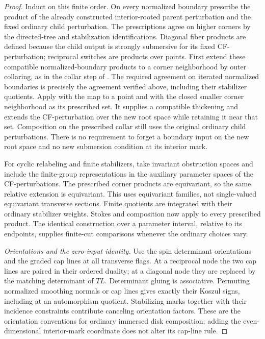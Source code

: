 \documentclass[11pt]{article}
\numberwithin{equation}{section}
\theoremstyle{definition}
\theoremstyle{remark}
\begin{document}
\begin{proof}
Induct on this finite order.  On every normalized boundary prescribe
the product of the already constructed interior-rooted parent
perturbation and the fixed ordinary child perturbation.  The
prescriptions agree on higher corners by the directed-tree and
stabilization identifications.  Diagonal fiber products are defined
because the child output is strongly submersive for its fixed
CF-perturbation; reciprocal switches are products over points.
First extend these compatible normalized-boundary products to a
corner neighborhood by outer collaring, as in the collar step of
\cite[Proposition~14.8 and Remark~14.7]{AFOOO2026}.  The required
agreement on iterated normalized boundaries is precisely the
agreement verified above, including their stabilizer quotients.
Apply \cite[Proposition~14.5]{AFOOO2026} with the map to a point
and with the closed smaller corner neighborhood as its prescribed
set.  It supplies a compatible thickening and extends the
CF-perturbation over the new root space while retaining it near
that set.  Composition on the prescribed collar still uses the
original ordinary child perturbations.  There is no requirement
to forget a boundary input on the new root space and no new
submersion condition at its interior mark.

For cyclic relabeling and finite stabilizers, take invariant
obstruction spaces and include the finite-group representations in
the auxiliary parameter spaces of the CF-perturbations.  The
prescribed corner products are equivariant, so the same relative
extension is equivariant.  This uses equivariant families, not
single-valued equivariant transverse sections.  Finite quotients
are integrated with their ordinary stabilizer weights.  Stokes and
composition now apply to every prescribed product.  The identical
construction over a parameter interval, relative to its endpoints,
supplies finite-cut comparisons whenever the ordinary choices vary.

\emph{Orientations and the zero-input identity.}
Use the spin determinant orientations and the graded cap lines at
all transverse flags.  At a reciprocal node the two cap lines are
paired in their ordered duality; at a diagonal node they are
replaced by the matching determinant of $TL$.  Determinant gluing
is associative.  Permuting normalized smoothing normals or cap
lines gives exactly their Koszul signs, including at an
automorphism quotient.  Stabilizing marks together with their
incidence constraints contribute canceling orientation factors.
These are the orientation conventions for ordinary immersed disk
composition; adding the even-dimensional interior-mark coordinate
does not alter its cap-line rule.


\end{proof}
\end{document}
